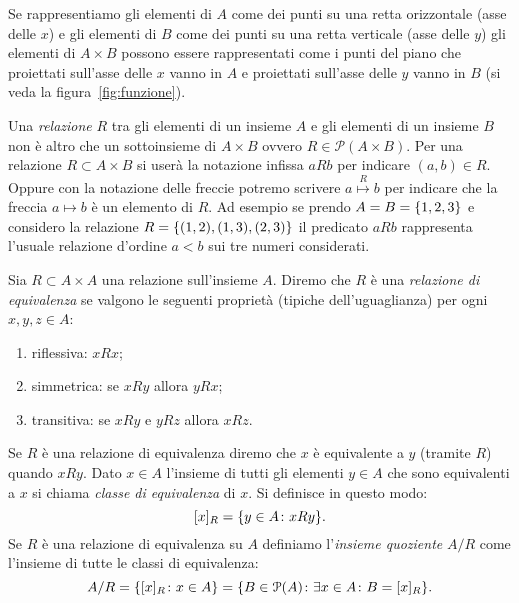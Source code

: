Se rappresentiamo gli elementi di $A$ come dei punti su una retta
orizzontale (asse delle $x$) e gli elementi di $B$ come dei punti
su una retta verticale (asse delle $y$) gli elementi di $A\times B$
possono essere rappresentati come i punti del piano che proiettati sull'asse
delle $x$ vanno in $A$ e proiettati sull'asse delle $y$ vanno in $B$
(si veda la figura~\ref{fig:funzione}). 
  
Una \emph{relazione}%
%
 $R$ tra gli elementi di un insieme $A$ e gli elementi
di un insieme $B$ non è altro che un sottoinsieme di $A\times B$
ovvero $R\in \mathcal P(A\times B)$.
Per una relazione $R\subset A\times B$ si userà la notazione infissa
$aRb$ per indicare $(a,b)\in R$.
Oppure con la notazione delle freccie potremo 
scrivere $a \stackrel R \mapsto b$
per indicare che la freccia $a\mapsto b$ è un elemento di $R$. 
Ad esempio se prendo $A=B={\left\{ 1,2,3 \right\}}$ e considero la relazione 
$R={\left\{ (1,2),(1,3),(2,3) \right\}}$
il predicato $aRb$ rappresenta l'usuale relazione d'ordine $a<b$ sui
tre numeri considerati.

\begin{definition}
\label{def:equivalenza}%
Sia $R\subset A\times A$ una relazione sull'insieme $A$. Diremo che 
$R$ è una \emph{relazione di equivalenza}%
%
 se valgono le seguenti proprietà
(tipiche dell'uguaglianza)
per ogni $x,y,z\in A$:
\begin{enumerate}
  \item riflessiva: $x R x$;
  \item simmetrica: se $x R y$ allora $y R x$;
  \item transitiva: se $x R y$ e $yRz$ allora $x R z$.
\end{enumerate}
Se $R$ è una relazione di equivalenza diremo che $x$ è equivalente a $y$ 
(tramite $R$) quando $xRy$.
Dato $x \in A$ l'insieme di tutti gli elementi $y\in A$ che sono equivalenti 
a $x$ si chiama \emph{classe di equivalenza}%
%
 di $x$. 
Si definisce in questo modo:
\[
  [x]_R = {\left\{ y\in A \colon xRy \right\}}.  
\]
Se $R$ è una relazione di equivalenza su $A$ definiamo 
l'\emph{insieme quoziente}
%
%
$A/R$
come l'insieme di tutte le classi di equivalenza:
\[
 A/R 
 = {\left\{ [x]_R\colon x\in A \right\}} 
 = {\left\{ B\in \mathcal P(A)\colon \exists x\in A\colon B=[x]_R \right\}}.  
\]
\end{definition}

